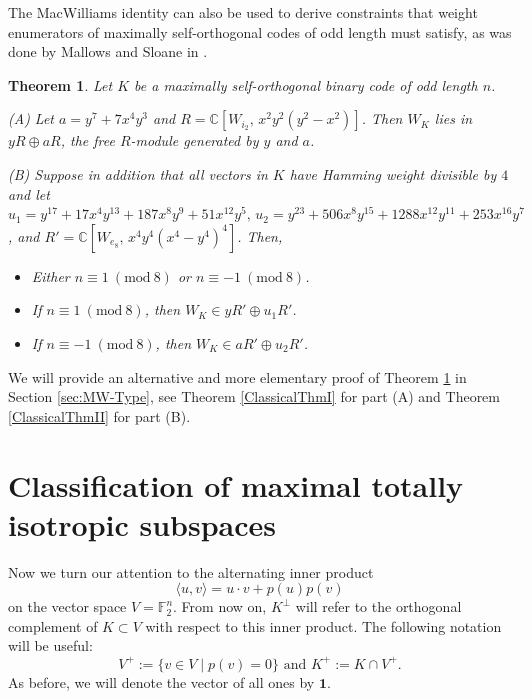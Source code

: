 \documentclass[a4paper,reqno]{amsart}
\newcommand{\bydef}{:=}
\newcommand{\buno}{\mathbf{1}}
\newcommand{\FF}{\mathbb{F}}
\newtheorem{theorem}{Theorem}[section]
\theoremstyle{definition}
\theoremstyle{remark} \newtheorem{remark}[theorem]{Remark}
\numberwithin{equation}{section}
\begin{document}
The MacWilliams identity can also be used to derive constraints that weight enumerators of maximally self-orthogonal codes of odd length must satisfy, as was done by Mallows and Sloane in \cite{MS}.

\begin{theorem}\label{self-orthogonalI}
Let $K$ be a maximally self-orthogonal binary code of odd length $n$.

    (A) Let \(a = y^7 + 7x^4y^3\) and \(R = \mathbb{C}[W_{i_2},\, x^2y^2(y^2 - x^2)]\). Then \(W_K\) lies in \(yR \oplus aR\), the free \(R\)-module generated by \(y\) and \(a\).

    (B) Suppose in addition that all vectors in \(K\) have Hamming weight divisible by \(4\) and let \(u_1 = y^{17} + 17x^4y^{13} + 187x^8y^9 + 51x^{12}y^5,\, u_2 = y^{23} + 506x^8y^{15} + 1288x^{12}y^{11} + 253x^{16}y^7\), and \(R' = \mathbb{C}[W_{e_8},\, x^4y^4(x^4 - y^4)^4]\). Then, 
    \begin{itemize}
        \item[(i)] Either \(n \equiv 1 \ (\mathrm{mod}\ 8)\) or \(n \equiv -1 \ (\mathrm{mod}\ 8)\).
        \item[(ii)] If \(n \equiv 1 \ (\mathrm{mod}\ 8)\), then \(W_K \in yR'\oplus u_1R'\).
        \item[(iii)] If \(n \equiv -1 \ (\mathrm{mod}\ 8)\), then \(W_K \in aR'\oplus u_2R'\).
    \end{itemize}
\end{theorem}

We will provide an alternative and more elementary proof of Theorem \ref{self-orthogonalI} in Section \ref{sec:MW-Type}, see Theorem \ref{ClassicalThmI} for part (A) and Theorem \ref{ClassicalThmII} for part (B).

\section{Classification of maximal totally isotropic subspaces}\label{sec:classification}

Now we turn our attention to the alternating inner product 
\begin{equation}\label{eq:inner_prod}
\langle u,v \rangle=u\cdot v+p(u)p(v)
\end{equation}
on the vector space $V=\FF_2^n$. From now on, $K^\perp$ will refer to the orthogonal complement of $K\subset V$ with respect to this inner product. The following notation will be useful:
\[
V^+ \bydef \{v\in V\mid p(v)=0\}\text{ and }K^+\bydef K\cap V^+.
\]
As before, we will denote the vector of all ones by $\buno$.
\end{document}
